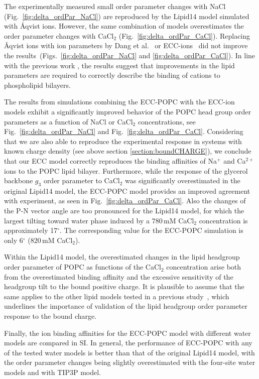 The experimentally measured small order parameter 
changes with NaCl (Fig.~\ref{fig:delta_ordPar_NaCl})  
are reproduced by the Lipid14 model simulated with Åqvist ions. 
However, the same combination of models overestimates the order parameter changes with CaCl$_2$ (Fig.~\ref{fig:delta_ordPar_CaCl}). 
Replacing Åqvist ions with ion parameters by Dang et al.~\citep{smith94, chang1999, dang2006} 
or ECC-ions~\citep{martinek17, kohagen16, Pluharova2014} did not improve 
the results~(Figs.~\ref{fig:delta_ordPar_NaCl} and \ref{fig:delta_ordPar_CaCl}). 
In line with the previous work \citep{catte16}, the results suggest that improvements 
in the lipid parameters are required to correctly describe the binding of cations to phospholipid bilayers. 
 
The results from simulations combining the ECC-POPC with the ECC-ion models \citep{martinek17, kohagen16, Pluharova2014} exhibit a significantly improved behavior of the POPC head group order parameters as a function of NaCl or CaCl$_2$ concentrations, see Fig.~\ref{fig:delta_ordPar_NaCl} and Fig.~\ref{fig:delta_ordPar_CaCl}. Considering that we are also able to reproduce the experimental response in systems with known charge density (see above section \ref{section:boundCHARGE}), we conclude that our ECC model correctly reproduces the binding affinities of Na$^{+}$ and Ca$^{2+}$ ions to the POPC lipid bilayer. Furthermore, while the response of the glycerol backbone $g_3$ order parameter to CaCl$_2$ was significantly overestimated in the original Lipid14 model, the ECC-POPC model provides an improved agreement with experiment, as seen in Fig.~\ref{fig:delta_ordPar_CaCl}. 
Also the changes of the P-N vector angle are too pronounced for the Lipid14 model, 
for which the largest tilting toward water phase induced by a $780\,\mathrm{mM}$ 
CaCl$_2$ concentration is approximately 17$^{\circ}$. The corresponding value 
for the ECC-POPC simulation is only 6$^{\circ}$ ($820\,\mathrm{mM}$ CaCl$_2$).  
 
Within the Lipid14 model, the overestimated changes in the lipid headgroup order parameter of POPC  as functions of the CaCl$_2$ concentration arise both from the overestimated binding affinity and the excessive sensitivity of the headgroup tilt to the bound positive charge. It is plausible to assume that the same applies to the other lipid models tested in a previous study~\citep{catte16}, which underlines the importance of validation of the lipid headgroup order parameter response to the bound charge.  
 
Finally, the ion binding affinities for the ECC-POPC model with different water models are compared in SI. In general, the performance of ECC-POPC with any of the tested water models is better than that of the original Lipid14 model, with the order parameter changes being slightly overestimated with the four-site water models and with TIP3P model. 
 

